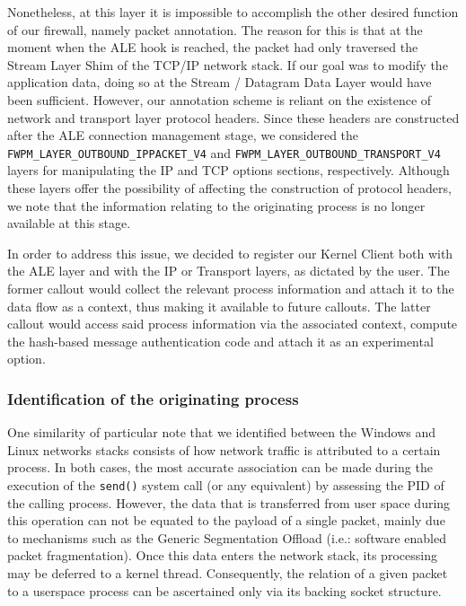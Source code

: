Nonetheless, at this layer it is impossible to accomplish the other desired function of our firewall, namely packet annotation. The reason for this is that at the moment when the ALE hook is reached, the packet had only traversed the Stream Layer Shim of the TCP/IP network stack. If our goal was to modify the application data, doing so at the Stream / Datagram Data Layer would have been sufficient. However, our annotation scheme is reliant on the existence of network and transport layer protocol headers. Since these headers are constructed after the ALE connection management stage, we considered the \texttt{FWPM\_LAYER\_OUTBOUND\_IPPACKET\_V4} and \texttt{FWPM\_LAYER\_OUTBOUND\_TRANSPORT\_V4} layers for manipulating the IP and TCP options sections, respectively. Although these layers offer the possibility of affecting the construction of protocol headers, we note that the information relating to the originating process is no longer available at this stage.

In order to address this issue, we decided to register our Kernel Client both with the ALE layer and with the IP or Transport layers, as dictated by the user. The former callout would collect the relevant process information and attach it to the data flow as a context, thus making it available to future callouts. The latter callout would access said process information via the associated context, compute the hash-based message authentication code and attach it as an experimental option.


\subsubsection{Identification of the originating process}
\label{sign:windows:implementation:originator}

One similarity of particular note that we identified between the Windows and Linux networks stacks consists of how network traffic is attributed to a certain process. In both cases, the most accurate association can be made during the execution of the \texttt{send()} system call (or any equivalent) by assessing the PID of the calling process. However, the data that is transferred from user space during this operation can not be equated to the payload of a single packet, mainly due to mechanisms such as the Generic Segmentation Offload (i.e.: software enabled packet fragmentation). Once this data enters the network stack, its processing may be deferred to a kernel thread. Consequently, the relation of a given packet to a userspace process can be ascertained only via its backing socket structure.

